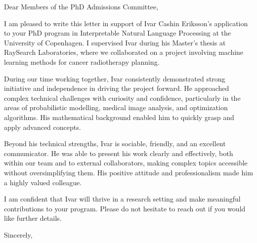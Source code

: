 \documentclass[11pt,a4paper]{letter}
\date{\today}
\begin{document}
\begin{letter}{}

\opening{Dear Members of the PhD Admissions Committee,}

I am pleased to write this letter in support of Ivar Cashin Eriksson's application to your PhD program in Interpretable Natural Language Processing at the University of Copenhagen. I supervised Ivar during his Master's thesis at RaySearch Laboratories, where we collaborated on a project involving machine learning methods for cancer radiotherapy planning.

During our time working together, Ivar consistently demonstrated strong initiative and independence in driving the project forward. He approached complex technical challenges with curiosity and confidence, particularly in the areas of probabilistic modelling, medical image analysis, and optimization algorithms. His mathematical background enabled him to quickly grasp and apply advanced concepts.

Beyond his technical strengths, Ivar is sociable, friendly, and an excellent communicator. He was able to present his work clearly and effectively, both within our team and to external collaborators, making complex topics accessible without oversimplifying them. His positive attitude and professionalism made him a highly valued colleague.

I am confident that Ivar will thrive in a research setting and make meaningful contributions to your program. Please do not hesitate to reach out if you would like further details.

\closing{Sincerely,}

\end{letter}
\end{document}
